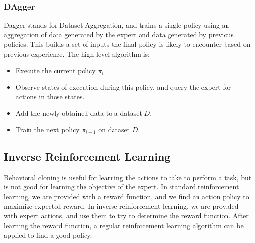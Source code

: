 \documentclass[12pt,titlepage]{article}
\begin{document}
      \subsubsection{DAgger}
        Dagger stands for Dataset Aggregation, and trains a single policy using an aggregation of data generated by the expert and data generated by previous
        policies. This builds a set of inputs the final policy is likely to encounter based on previous experience. The high-level algorithm is:
        \begin{itemize}
          \item Execute the current policy $\pi_i$.
          \item Observe states of execution during this policy, and query the expert for actions in those states.
          \item Add the newly obtained data to a dataset $D$.
          \item Train the next policy $\pi_{i+1}$ on dataset $D$.
        \end{itemize}

    \subsection{Inverse Reinforcement Learning}
      Behavioral cloning is useful for learning the actions to take to perform a task, but is not good for learning the objective of the expert. In standard
      reinforcement learning, we are provided with a reward function, and we find an action policy to maximize expected reward. In inverse reinforcement
      learning, we are provided with expert actions, and use them to try to determine the reward function. After learning the reward function, a regular
      reinforcement learning algorithm can be applied to find a good policy.
\end{document}
